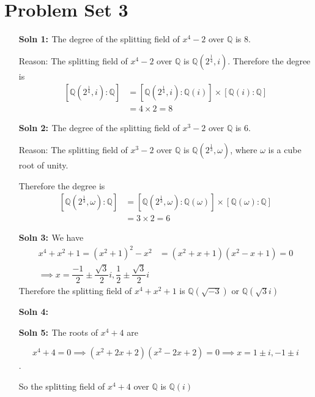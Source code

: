 \documentclass[12pt]{article}
\begin{document}
\section{Problem Set 3 }

    \begin{enumerate}
        \item[\bf{Soln 1: }]  The degree of the splitting field of $x^4-2$ over $\mathbb{Q}$ is 8. 


        Reason: The splitting field of $x^4-2$ over $\mathbb{Q}$ is $\mathbb{Q}(2^\frac{1}{4},i)$. Therefore the degree is 
         \[   
        \begin{aligned}
            [\mathbb{Q}(2^\frac{1}{4},i):\mathbb{Q}]&= [\mathbb{Q}(2^\frac{1}{4},i):\mathbb{Q}(i)]\times[\mathbb{Q}(i):\mathbb{Q}]\\
            &=4\times2=8
        \end{aligned}
        \]

        \item[\bf{Soln 2: }] The degree of the splitting field of $x^3-2$ over $\mathbb{Q}$ is 6.

        Reason: The splitting field of $x^3-2$ over $\mathbb{Q}$ is $\mathbb{Q}(2^\frac{1}{3},\omega)$, where $\omega$ is a cube root of unity. 

        Therefore the degree is 
        \[
        \begin{aligned}
            [\mathbb{Q}(2^\frac{1}{3},\omega):\mathbb{Q}]&=[\mathbb{Q}(2^\frac{1}{3},\omega):\mathbb{Q}(\omega)] \times [\mathbb{Q}(\omega):\mathbb{Q}]\\
            &=3\times2=6
        \end{aligned}
        \]

        \item[\bf{Soln 3: }] We have \[
        \begin{aligned}
        x^4+x^2+1=(x^2+1)^2-x^2&=(x^2+x+1)(x^2-x+1)=0 \\
                                \implies x=\dfrac{-1}{2}\pm\dfrac{\sqrt3}{2}i,\dfrac{1}{2}\pm\dfrac{\sqrt3}{2}i
    \end{aligned}   
        \]
        Therefore the splitting field of $x^4+x^2+1$ is $\mathbb{Q}(\sqrt{-3})$ or $\mathbb{Q}(\sqrt{3}i)$
    \item[\bf{Soln 4: }] 
    \item[\bf{Soln 5: }] The roots of $x^4+4$ are 

    \[ x^4+4=0\implies (x^2+2x+2)(x^2-2x+2)=0\implies x=1\pm i,-1\pm i\].

    So the splitting field of $x^4+4$ over $\mathbb{Q}$ is $\mathbb{Q}(i)$

    \item[\bf{}] 
    \end{enumerate}
\end{document}
